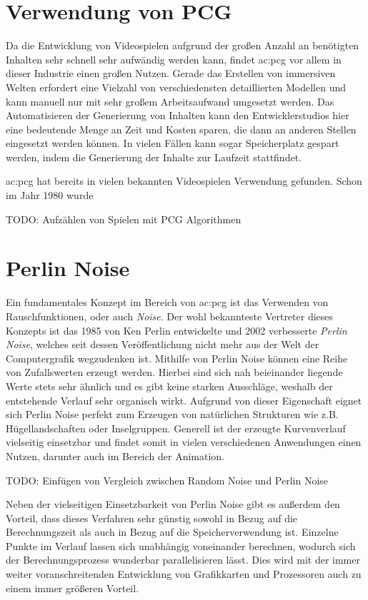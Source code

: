 \section{Verwendung von PCG}
Da die Entwicklung von Videospielen aufgrund der großen Anzahl an benötigten Inhalten sehr schnell sehr aufwändig werden
kann, findet \gls{ac:pcg} vor allem in dieser Industrie einen großen Nutzen. Gerade das Erstellen von immersiven Welten erfordert eine Vielzahl
von verschiedensten detaillierten Modellen und kann manuell nur mit sehr großem Arbeitsaufwand umgesetzt werden. Das Automatisieren der
Generierung von Inhalten kann den Entwicklerstudios hier eine bedeutende Menge an Zeit und Kosten sparen, die dann an anderen
Stellen eingesetzt werden können. In vielen Fällen kann sogar Speicherplatz gespart werden, indem die Generierung der Inhalte
zur Laufzeit stattfindet.

\gls{ac:pcg} hat bereits in vielen bekannten Videospielen Verwendung gefunden. Schon im Jahr 1980 wurde %

TODO: Aufzählen von Spielen mit PCG Algorithmen

\section{Perlin Noise}
Ein fundamentales Konzept im Bereich von \gls{ac:pcg} ist das Verwenden von Rauschfunktionen, oder auch \textit{Noise}.
Der wohl bekannteste Vertreter dieses Konzepts ist das 1985 von Ken Perlin entwickelte \cite{16_perlin} und 2002 verbesserte \cite{18_perlin}
\textit{Perlin Noise}, welches seit dessen Veröffentlichung nicht mehr aus der Welt der Computergrafik wegzudenken ist. Mithilfe von
Perlin Noise können eine Reihe von Zufallswerten erzeugt werden. Hierbei sind sich nah beieinander liegende Werte stets sehr ähnlich und es
gibt keine starken Ausschläge, weshalb der entstehende Verlauf sehr organisch wirkt. Aufgrund von dieser Eigenschaft eignet sich Perlin Noise
perfekt zum Erzeugen von natürlichen Strukturen wie z.B. Hügellandschaften oder Inselgruppen. Generell ist der erzeugte Kurvenverlauf vielseitig
einsetzbar und findet somit in vielen verschiedenen Anwendungen einen Nutzen, darunter auch im Bereich der Animation. \cite{17_lagae_et_al}

TODO: Einfügen von Vergleich zwischen Random Noise und Perlin Noise

Neben der vielseitigen Einsetzbarkeit von Perlin Noise gibt es außerdem den Vorteil, dass dieses Verfahren sehr günstig sowohl in Bezug auf
die Berechnungszeit als auch in Bezug auf die Speicherverwendung ist. Einzelne Punkte im Verlauf lassen sich unabhängig voneinander berechnen,
wodurch sich der Berechnungsprozess wunderbar parallelisieren lässt. Dies wird mit der immer weiter voranschreitenden Entwicklung von
Grafikkarten und Prozessoren auch zu einem immer größeren Vorteil. \cite{17_lagae_et_al}


